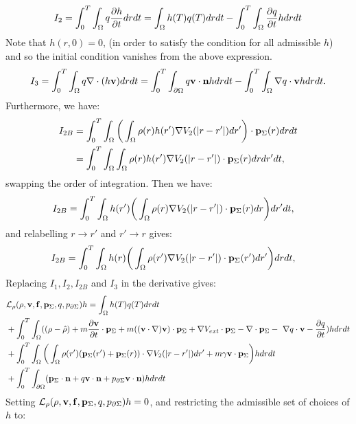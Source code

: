 \begin{align*}
I_2 = \int_0^T \int_\Omega q\frac{\partial h}{\partial t} dr dt = \int_\Omega h(T) q(T) dr dt - \int_0^T \int_\Omega  \frac{\partial q}{\partial t}h dr dt
\end{align*}
Note that ${h}(r,0)=0$, (in order to satisfy the condition for all admissible ${h}$) and so the initial condition vanishes from the above expression.
\begin{align*}
I_3= \int_0^T \int_\Omega q\nabla \cdot (h \mathbf{v}) dr dt = \int_0^T \int_{\partial \Omega} q \mathbf{v} \cdot \mathbf{n} h dr dt - \int_0^T \int_\Omega \nabla q \cdot \mathbf{v} h dr dt.
\end{align*}
Furthermore, we have:
\begin{align*}
I_{2B}&= \int_0^T \int_\Omega \bigg(\int_\Omega \rho(r) h(r') \nabla V_2(|r-r'|)dr'\bigg) \cdot \mathbf{p}_\Sigma(r) drdt\\
&=\int_0^T \int_\Omega \int_\Omega \rho(r) h(r') \nabla V_2(|r-r'|) \cdot \mathbf{p}_\Sigma(r) drdr'dt,
\end{align*}
swapping the order of integration. Then we have:
\begin{align*}
I_{2B}&= \int_0^T \int_\Omega  h(r')\bigg(\int_\Omega  \rho(r)\nabla V_2(|r-r'|) \cdot \mathbf{p}_\Sigma(r) dr \bigg)dr'dt,
\end{align*}
and relabelling $r \to r'$ and $r' \to r$ gives:
\begin{align*}
I_{2B}&= \int_0^T \int_\Omega  h(r)\bigg(\int_\Omega  \rho(r')\nabla V_2(|r-r'|) \cdot \mathbf{p}_\Sigma(r') dr' \bigg)drdt,
\end{align*}
Replacing $I_1, I_2, I_{2B}$ and $I_3$ in the derivative gives:
\begin{align*}
&\mathcal{L}_\rho(\rho,\mathbf{v},\mathbf{f},\mathbf{p}_\Sigma,q,p_{\partial \Sigma})h = \int_\Omega h(T) q(T) dr dt  \\
&+ \int_0^T \int_\Omega ( (\rho - \hat {\rho}) +m  \frac{\partial \mathbf{v}}{\partial t}\cdot \mathbf{p}_\Sigma + m  ((\mathbf{v} \cdot \nabla)\mathbf{v} )\cdot \mathbf{p}_\Sigma+ \nabla V_{ext}\cdot \mathbf{p}_\Sigma -\nabla\cdot \mathbf{p}_\Sigma  - \ \nabla q \cdot \mathbf{v}  -  \frac{\partial q}{\partial t}) h dr dt \\
&+ \int_0^T \int_\Omega  \bigg(\int_\Omega  \rho(r')(\mathbf{p}_\Sigma(r') + \mathbf{p}_\Sigma(r)) \cdot\nabla V_2(|r-r'|)   dr' + m \gamma \mathbf{v} \cdot \mathbf{p}_\Sigma \bigg)hdr dt\\
&+\int_0^T \int_{\partial \Omega} ( \mathbf{p}_\Sigma \cdot \mathbf{n}  +  q \mathbf{v} \cdot \mathbf{n}   +p_{\partial \Sigma} \mathbf{v} \cdot \mathbf{n})h  dr dt
\end{align*}
Setting $\mathcal{L}_\rho(\rho,\mathbf{v},\mathbf{f},\mathbf{p}_\Sigma,q,p_{\partial \Sigma})h=0$, and restricting the admissible set of choices of $h$ to:
